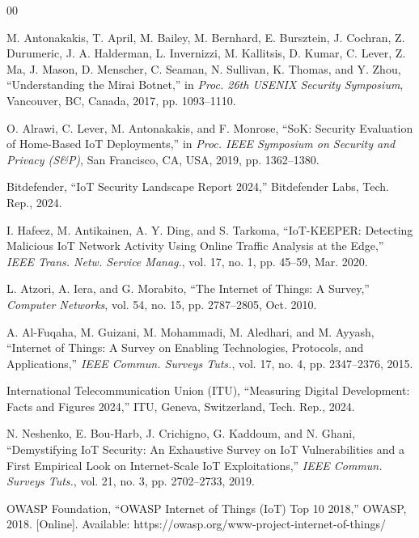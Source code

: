 \documentclass[conference]{IEEEtran}
\begin{document}
\begin{thebibliography}{00}

M. Antonakakis, T. April, M. Bailey, M. Bernhard, E. Bursztein, J. Cochran, Z. Durumeric, J. A. Halderman, L. Invernizzi, M. Kallitsis, D. Kumar, C. Lever, Z. Ma, J. Mason, D. Menscher, C. Seaman, N. Sullivan, K. Thomas, and Y. Zhou, ``Understanding the Mirai Botnet,'' in \textit{Proc. 26th USENIX Security Symposium}, Vancouver, BC, Canada, 2017, pp. 1093--1110.

O. Alrawi, C. Lever, M. Antonakakis, and F. Monrose, ``SoK: Security Evaluation of Home-Based IoT Deployments,'' in \textit{Proc. IEEE Symposium on Security and Privacy (S\&P)}, San Francisco, CA, USA, 2019, pp. 1362--1380.

Bitdefender, ``IoT Security Landscape Report 2024,'' Bitdefender Labs, Tech. Rep., 2024.

I. Hafeez, M. Antikainen, A. Y. Ding, and S. Tarkoma, ``IoT-KEEPER: Detecting Malicious IoT Network Activity Using Online Traffic Analysis at the Edge,'' \textit{IEEE Trans. Netw. Service Manag.}, vol. 17, no. 1, pp. 45--59, Mar. 2020.

L. Atzori, A. Iera, and G. Morabito, ``The Internet of Things: A Survey,'' \textit{Computer Networks}, vol. 54, no. 15, pp. 2787--2805, Oct. 2010.

A. Al-Fuqaha, M. Guizani, M. Mohammadi, M. Aledhari, and M. Ayyash, ``Internet of Things: A Survey on Enabling Technologies, Protocols, and Applications,'' \textit{IEEE Commun. Surveys Tuts.}, vol. 17, no. 4, pp. 2347--2376, 2015.

International Telecommunication Union (ITU), ``Measuring Digital Development: Facts and Figures 2024,'' ITU, Geneva, Switzerland, Tech. Rep., 2024.

N. Neshenko, E. Bou-Harb, J. Crichigno, G. Kaddoum, and N. Ghani, ``Demystifying IoT Security: An Exhaustive Survey on IoT Vulnerabilities and a First Empirical Look on Internet-Scale IoT Exploitations,'' \textit{IEEE Commun. Surveys Tuts.}, vol. 21, no. 3, pp. 2702--2733, 2019.

OWASP Foundation, ``OWASP Internet of Things (IoT) Top 10 2018,'' OWASP, 2018. [Online]. Available: https://owasp.org/www-project-internet-of-things/


\end{thebibliography}
\end{document}
